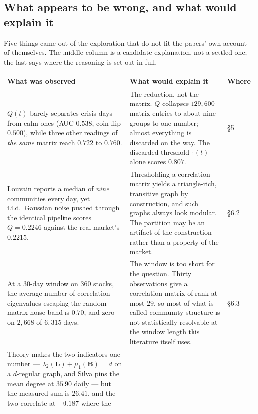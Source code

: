\documentclass[11pt,a4paper]{article}
\newcommand{\Q}{Q}
\newcommand{\Lap}{\mathbf{L}}
\newcommand{\Bmat}{\mathbf{B}}
\begin{document}
\subsection*{What appears to be wrong, and what would explain it}

Five things came out of the exploration that do not fit the papers' own account
of themselves. The middle column is a candidate explanation, not a settled one;
the last says where the reasoning is set out in full.

\begin{center}\small
\renewcommand{\arraystretch}{1.22}\setlength{\tabcolsep}{4.5pt}
\begin{tabular}{@{}>{\raggedright\arraybackslash}p{5.7cm}
                  >{\raggedright\arraybackslash}p{8.05cm}
                  >{\raggedright\arraybackslash}p{1.3cm}@{}}
\toprule
\textbf{What was observed} & \textbf{What would explain it} & \textbf{Where} \\
\midrule
$\Q(t)$ barely separates crisis days from calm ones (AUC $0.538$, coin flip
$0.500$), while three other readings of \emph{the same} matrix reach $0.722$ to
$0.760$. &
The reduction, not the matrix. $\Q$ collapses $129{,}600$ matrix entries to
about nine groups to one number; almost everything is discarded on the way. The
discarded threshold $\tau(t)$ alone scores $0.807$. &
\S5 \\
\addlinespace[2pt]
Louvain reports a median of \emph{nine} communities every day, yet i.i.d.\
Gaussian noise pushed through the identical pipeline scores $\Q=0.2246$ against
the real market's $0.2215$. &
Thresholding a correlation matrix yields a triangle-rich, transitive graph by
construction, and such graphs always look modular. The partition may be an
artifact of the construction rather than a property of the market. &
\S6.2 \\
\addlinespace[2pt]
At a 30-day window on 360 stocks, the average number of correlation eigenvalues
escaping the random-matrix noise band is $\mathbf{0.70}$, and zero on $2{,}668$
of $6{,}315$ days. &
The window is too short for the question. Thirty observations give a
correlation matrix of rank at most $29$, so most of what is called community
structure is not statistically resolvable at the window length this literature
itself uses. &
\S6.3 \\
\addlinespace[2pt]
Theory makes the two indicators one number --- $\lambda_2(\Lap)+\mu_1(\Bmat)=d$
on a $d$-regular graph, and Silva pins the mean degree at $35.90$ daily --- but
the measured sum is $26.41$, and the two correlate at $-0.187$ where the

\end{tabular}
\end{center}
\end{document}
